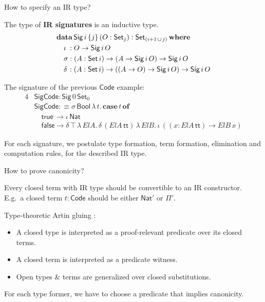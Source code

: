 \documentclass[dvipsnames,aspectratio=169]{beamer}
\newcommand{\ms}[1]{\mathsf{#1}}
\newcommand{\mbf}[1]{\mathbf{#1}}
\newcommand{\data}{\mbf{data}}
\newcommand{\Set}{\ms{Set}}
\newcommand{\where}{\mbf{where}}
\newcommand{\Nat}{\ms{Nat}}
\newcommand{\Sig}{\ms{Sig}}
\newcommand{\Code}{\ms{Code}}
\newcommand{\case}{\mbf{case}}
\newcommand{\of}{\mbf{of}}
\newcommand{\ttt}{\ms{tt}}
\newcommand{\Bool}{\ms{Bool}}
\newcommand{\true}{\ms{true}}
\newcommand{\false}{\ms{false}}
\begin{document}
\begin{frame}{How to specify an IR type?}

The type of \textbf{IR signatures} is an inductive type.
\vspace{-0.5em}
\begin{alignat*}{4}
  &\data\, \Sig\,i\,\{j\}\,(O : \Set_j) : \Set_{(i+1\,\sqcup\,j)}\,\where\\
  &\quad \iota\hspace{0.25em}  : O \to \Sig\,i\,O \\
  &\quad \sigma               : (A : \Set\,i) \to (A \to \Sig\,i\,O) \to \Sig\,i\,O \\
  &\quad \delta\hspace{0.1em} : (A : \Set\,i) \to ((A \to O) \to \Sig\,i\,O) \to \Sig\,i\,O
\end{alignat*}

The signature of the previous $\ms{Code}$ example:
\begin{alignat*}{4}
  & \ms{SigCode} : \Sig\,0\,\Set_0\\
  & \ms{SigCode} :\equiv \sigma\,\Bool\,\lambda\,t.\,\case\,t\,\of \\
  & \quad \true  \,\to \iota\,\Nat \\
  & \quad \false \to \delta\,\top\,\lambda\,{ElA}.\, \delta\,({ElA}\,\ttt)\,\lambda\,{ElB}.\,
      \iota\, ((x : {ElA}\,\ttt) \to {ElB}\,x)
\end{alignat*}

For each signature, we postulate type formation, term formation, elimination and computation rules,
for the described IR type.

\end{frame}


\begin{frame}{How to prove canonicity?}

Every closed term with IR type should be convertible to an IR constructor.
E.g.\ a closed term $t : \Code$ should be either $\Nat'$ or $\Pi'$.
\vspace{1em}

Type-theoretic Artin gluing \cite{coquand2018canonicity,gluing}:
\begin{itemize}
  \item A closed type is interpreted as a proof-relevant predicate over its closed terms.
  \item A closed term is interpreted as a predicate witness.
  \item Open types \& terms are generalized over closed substitutions.
\end{itemize}
\vspace{1em}

For each type former, we have to choose a predicate that implies canonicity.
\vspace{1em}

\end{frame}
\end{document}
